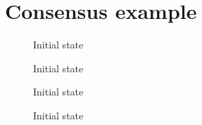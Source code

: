 \chapter{Consensus example}
\label{app:consensus-example}

\begin{figure}[htb]
    \centering
    \caption{Initial state}
    \label{fig:trustchain-1}
\end{figure}

\begin{figure}[htb]
    \centering
    \caption{Initial state}
    \label{fig:trustchain-2}
\end{figure}

\begin{figure}
    \centering
    \caption{Initial state}
    \label{fig:trustchain-3}
\end{figure}

\begin{figure}
    \centering
    \caption{Initial state}
    \label{fig:trustchain-4}
\end{figure}
